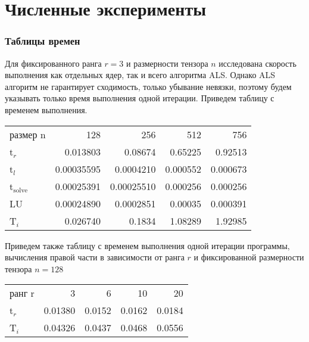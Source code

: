 \documentclass[presentation]{beamer}
\begin{document}
\section{Численные эксперименты}
\label{sec-3}
\begin{frame}
\frametitle{Таблицы времен}
\label{sec-3-1}

Для фиксированного ранга $r=3$ и размерности тензора $n$ исследована скорость выполнения как отдельных ядер, 
так и всего алгоритма ALS. Однако ALS алгоритм не гарантирует сходимость, только
убывание невязки, поэтому будем указывать только время выполнения одной итерации.
Приведем таблицу с временем выполнения.

\begin{center}
\begin{tabular}{lrrrr}
 размер n              &         128  &         256  &       512  &       756  \\
 t$_r$                 &    0.013803  &     0.08674  &   0.65225  &   0.92513  \\
 t$_l$                 &  0.00035595  &   0.0004210  &  0.000552  &  0.000673  \\
 t$_{\mathrm{solve}}$  &  0.00025391  &  0.00025510  &  0.000256  &  0.000256  \\
 LU                    &  0.00024890  &   0.0002851  &   0.00035  &  0.000391  \\
 T$_i$                 &    0.026740  &      0.1834  &   1.08289  &   1.92985  \\
\end{tabular}
\end{center}
\end{frame}
\begin{frame}

Приведем также таблицу с временем выполнения одной итерации программы, вычисления
правой части в зависимости от ранга $r$ и фиксированной размерности тензора $n=128$

\begin{center}
\begin{tabular}{lrrrr}
 ранг r  &        3  &       6  &      10  &      20  \\
 t$_r$   &  0.01380  &  0.0152  &  0.0162  &  0.0184  \\
 T$_i$   &  0.04326  &  0.0437  &  0.0468  &  0.0556  \\
\end{tabular}
\end{center}
\end{frame}
\end{document}

